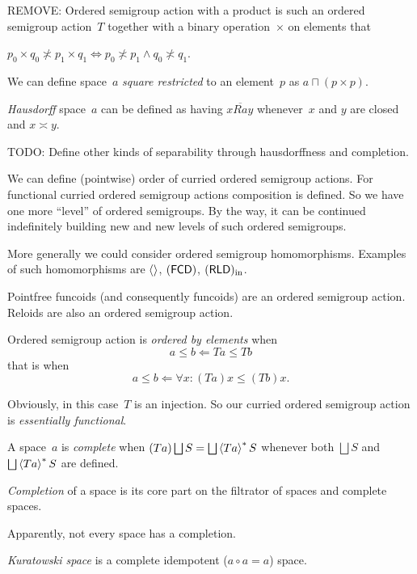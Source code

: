 REMOVE: Ordered semigroup action with a product is such an ordered semigroup action~$T$ together with a binary operation~$\times$ on elements that 

\begin{thm}
$p_0\times q_0\nasymp p_1\times q_1 \Leftrightarrow p_0\nasymp p_1\land q_0\nasymp q_1$.
\end{thm}

We can define space~$a$ \emph{square restricted} to an element~$p$ as $a\sqcap(p\times p)$.

\emph{Hausdorff} space~$a$ can be defined as having $x\overline{Ra}y$ whenever~$x$ and $y$ are closed and $x\asymp y$.

TODO: Define other kinds of separability through hausdorffness and completion.

We can define (pointwise) order of curried ordered semigroup actions. For functional curried ordered semigroup actions composition is defined. So we have one more ``level'' of ordered semigroups. By the way, it can be continued indefinitely building new and new levels of such ordered semigroups.

More generally we could consider ordered semigroup homomorphisms. Examples of such homomorphisms are $\left\langle \right\rangle$, $(\mathsf{FCD})$, $(\mathsf{RLD})_{\mathrm{in}}$.

Pointfree funcoids (and consequently funcoids) are an ordered semigroup action. Reloids are also an ordered semigroup action.

Ordered semigroup action is \emph{ordered by elements} when \[ a\leq b \Leftarrow Ta\leq Tb \] that is when \[ a\leq b \Leftarrow \forall x:(Ta)x\leq(Tb)x. \]

Obviously, in this case~$T$ is an injection. So our curried ordered semigroup action is \emph{essentially functional}.

A space~$a$ is \emph{complete} when $(Ta)\bigsqcup S=\bigsqcup\rsupfun{Ta}S$ whenever both $\bigsqcup S$ and $\bigsqcup\rsupfun{Ta}S$ are defined.

\begin{defn}
\emph{Completion} of a space is its core part on the filtrator of spaces and complete spaces.
\end{defn}

\begin{note}
Apparently, not every space has a completion.
\end{note}

\begin{defn}
\emph{Kuratowski space} is a complete idempotent ($a\circ a=a$) space.
\end{defn}

